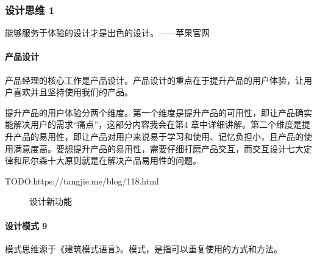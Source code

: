 \documentclass[letterpaper,10pt,english]{sphinxmanual}
\begin{document}
\subsubsection{设计思维 1\sphinxfootnotemark[450]}
\label{\detokenize{chapter_idea/design:id1}}\label{\detokenize{chapter_idea/design::doc}}%
\begin{footnotetext}[450]\sphinxAtStartFootnote
{}
%
\end{footnotetext}\ignorespaces 
能够服务于体验的设计才是出色的设计。——苹果官网


\paragraph{产品设计}
\label{\detokenize{chapter_idea/design:id2}}
产品经理的核心工作是产品设计。产品设计的重点在于提升产品的用户体验，让用户喜欢并且坚持使用我们的产品。

提升产品的用户体验分两个维度。第一个维度是提升产品的可用性，即让产品确实能解决用户的需求“痛点”，这部分内容我会在第4
章中详细讲解。第二个维度是提升产品的易用性，即让产品对用户来说易于学习和使用、记忆负担小，且产品的使用满意度高。要想提升产品的易用性，需要仔细打磨产品交互，而交互设计七大定律和尼尔森十大原则就是在解决产品易用性的问题。

TODO:https://tangjie.me/blog/118.html

\begin{figure}[H]
\centering
\capstart

\noindent{}
\caption{设计新功能\sphinxfootnotemark[451]}\label{\detokenize{chapter_idea/design:id20}}\end{figure}
%
\begin{footnotetext}[451]\sphinxAtStartFootnote
{}
%
\end{footnotetext}\ignorespaces 

\paragraph{设计模式 9\sphinxfootnotemark[452]}
\label{\detokenize{chapter_idea/design:id3}}%
\begin{footnotetext}[452]\sphinxAtStartFootnote
{}
%
\end{footnotetext}\ignorespaces 
模式思维源于《建筑模式语言》。模式，是指可以重复使用的方式和方法。
\end{document}

